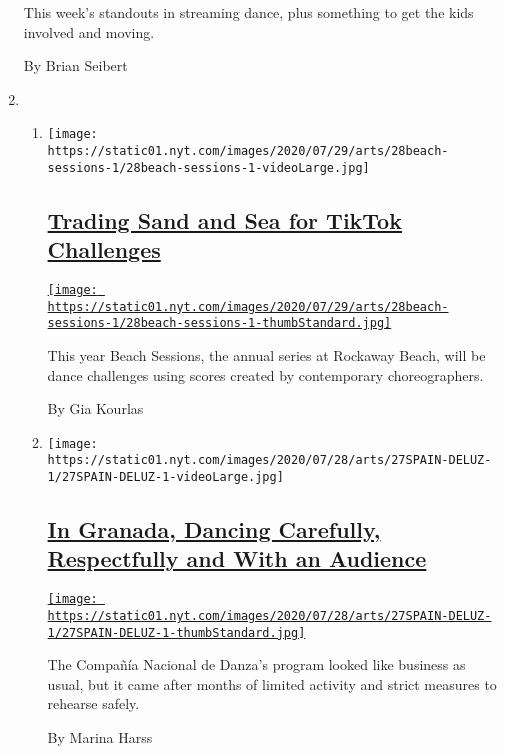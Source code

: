 \begin{enumerate}
  This week's standouts in streaming dance, plus something to get the
  kids involved and moving.

  By Brian Seibert
\item
  \begin{enumerate}
  \def\labelenumii{\arabic{enumii}.}
  \item
    \texttt{[image: https://static01.nyt.com/images/2020/07/29/arts/28beach-sessions-1/28beach-sessions-1-videoLarge.jpg]}

    \hypertarget{trading-sand-and-sea-for-tiktok-challenges}{%
    \subsection{\texorpdfstring{\href{/2020/07/28/arts/dance/beach-sessions-rockaway-tiktok.html}{Trading
    Sand and Sea for TikTok
    Challenges}}{Trading Sand and Sea for TikTok Challenges}}\label{trading-sand-and-sea-for-tiktok-challenges}}

    \href{/2020/07/28/arts/dance/beach-sessions-rockaway-tiktok.html}{\texttt{[image: https://static01.nyt.com/images/2020/07/29/arts/28beach-sessions-1/28beach-sessions-1-thumbStandard.jpg]}}

    This year Beach Sessions, the annual series at Rockaway Beach, will
    be dance challenges using scores created by contemporary
    choreographers.

    By Gia Kourlas
  \item
    \texttt{[image: https://static01.nyt.com/images/2020/07/28/arts/27SPAIN-DELUZ-1/27SPAIN-DELUZ-1-videoLarge.jpg]}

    \hypertarget{in-granada-dancing-carefully-respectfully-and-with-an-audience}{%
    \subsection{\texorpdfstring{\href{/2020/07/27/arts/dance/granada-festival-compania-nacional-de-danza.html}{In
    Granada, Dancing Carefully, Respectfully and With an
    Audience}}{In Granada, Dancing Carefully, Respectfully and With an Audience}}\label{in-granada-dancing-carefully-respectfully-and-with-an-audience}}

    \href{/2020/07/27/arts/dance/granada-festival-compania-nacional-de-danza.html}{\texttt{[image: https://static01.nyt.com/images/2020/07/28/arts/27SPAIN-DELUZ-1/27SPAIN-DELUZ-1-thumbStandard.jpg]}}

    The Compañía Nacional de Danza's program looked like business as
    usual, but it came after months of limited activity and strict
    measures to rehearse safely.

    By Marina Harss
  \end{enumerate}
\end{enumerate}

